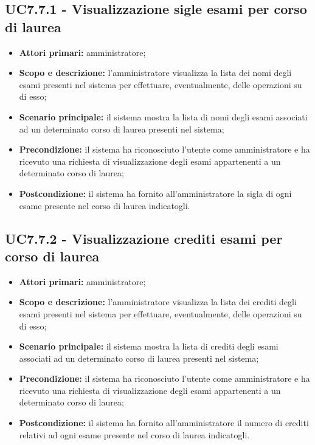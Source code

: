 \documentclass[AnalisiDeiRequisiti.tex]{subfiles}
\begin{document}
\subsection{UC7.7.1 - Visualizzazione sigle esami per corso di laurea}
\begin{itemize}
	\item \textbf{Attori primari:} amministratore;
	\item \textbf{Scopo e descrizione:} l'amministratore visualizza la lista dei nomi degli esami presenti nel sistema per effettuare, eventualmente, delle operazioni su di esso;
	\item \textbf{Scenario principale:} il sistema mostra la lista di nomi degli esami associati ad un determinato corso di laurea presenti nel sistema;
	\item \textbf{Precondizione:} il sistema ha riconosciuto l'utente come amministratore e ha ricevuto una richiesta di visualizzazione degli esami appartenenti a un determinato corso di laurea; 
	\item \textbf{Postcondizione:} il sistema ha fornito all'amministratore la sigla di ogni esame presente nel corso di laurea indicatogli.
\end{itemize}
\subsection{UC7.7.2 - Visualizzazione crediti esami per corso di laurea}
\begin{itemize}
	\item \textbf{Attori primari:} amministratore;
	\item \textbf{Scopo e descrizione:} l'amministratore visualizza la lista dei crediti degli esami presenti nel sistema per effettuare, eventualmente, delle operazioni su di esso;
	\item \textbf{Scenario principale:} il sistema mostra la lista di crediti degli esami associati ad un determinato corso di laurea presenti nel sistema;
	\item \textbf{Precondizione:} il sistema ha riconosciuto l'utente come amministratore e ha ricevuto una richiesta di visualizzazione degli esami appartenenti a un determinato corso di laurea; 
	\item \textbf{Postcondizione:} il sistema ha fornito all'amministratore il numero di crediti relativi ad ogni esame presente nel corso di laurea indicatogli.
\end{itemize}
\end{document}
